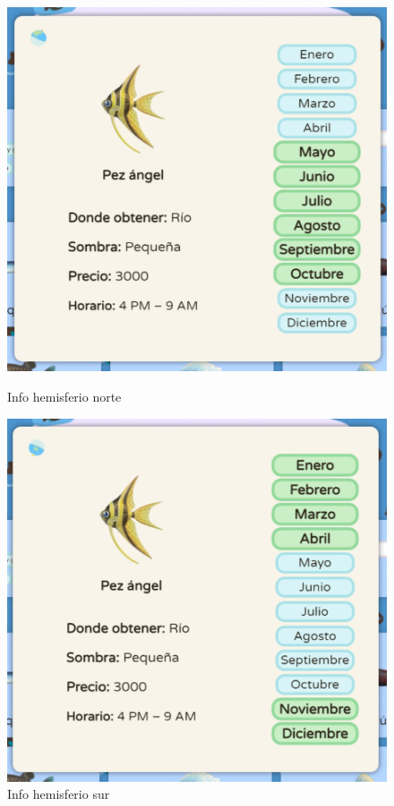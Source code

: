 \begin{figure}[!htb]
	\begin{minipage}{0.48\textwidth}
		\centering
		\includegraphics[width=.9\linewidth]{img/cap9/6-pez-info-norte.png}
		\caption{Info hemisferio norte}
		\label{fig:infonorte}
	\end{minipage}\hfill
	\begin{minipage}{0.48\textwidth}
		\centering
		\includegraphics[width=.9\linewidth]{img/cap9/7-pez-info-sur.png}
		\caption{Info hemisferio sur}
		\label{fig:infosur}
	\end{minipage}
\end{figure}


